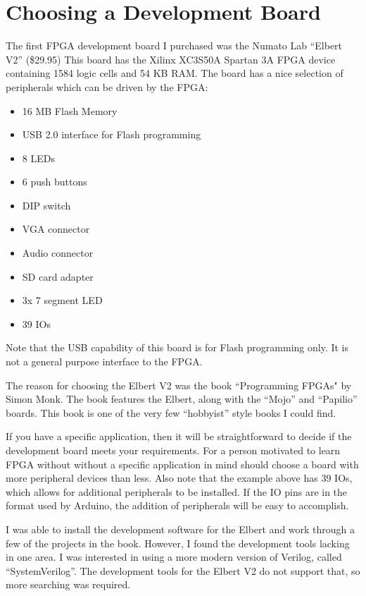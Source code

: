 \section{Choosing a Development Board}

The first FPGA development board I purchased was the Numato Lab ``Elbert V2'' (\$29.95)
This board has the Xilinx XC3S50A Spartan 3A FPGA device containing 1584 logic cells and
54 KB RAM.  The board has a nice selection of peripherals which can be driven
by the FPGA:

\begin{itemize}
	\item 16 MB Flash Memory
	\item USB 2.0 interface for Flash programming
	\item 8 LEDs
	\item 6 push buttons
	\item DIP switch
	\item VGA connector
	\item Audio connector
	\item SD card adapter
	\item 3x 7 segment LED
	\item 39 IOs
\end{itemize}

Note that the USB capability of this board is for Flash programming only.  It is not a general purpose interface to the FPGA.

The reason for choosing the Elbert V2 was the book ``Programming FPGAs" by Simon Monk.  The book features the Elbert, along with the ``Mojo'' and ``Papilio'' boards.  This book is one of the very few ``hobbyist'' style books I could find.

If you have a specific application, then it will be straightforward to decide if the development board meets your requirements.  For a person motivated to learn FPGA without without a specific application in mind should choose a board with more peripheral devices than less.  Also note that the example above has 39 IOs, which allows for additional peripherals to be installed.  If the IO pins are in the format used by Arduino, the addition of peripherals will be easy to accomplish.

I was able to install the development software for the Elbert and work through a few of the projects in the book.
However, I found the development tools lacking in one area.  I was interested in using a more modern version of Verilog, called ``SystemVerilog''.  The development tools for the Elbert V2 do not support that, so more searching was required.

